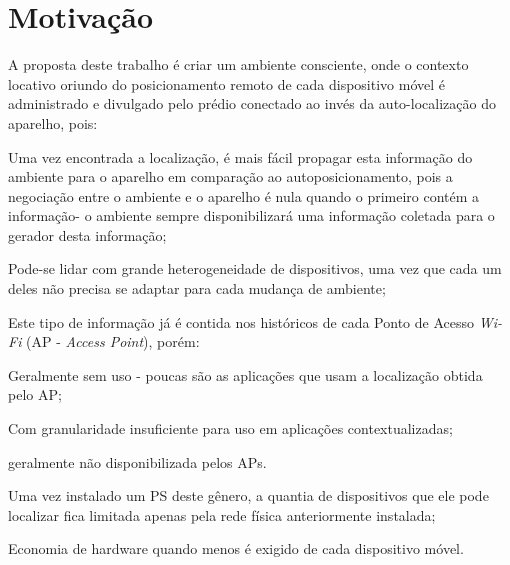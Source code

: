 \section{Motivação}
\label{sec:Motivação}

A proposta deste trabalho é criar um ambiente consciente, onde o contexto
locativo oriundo do posicionamento remoto de cada dispositivo móvel é
administrado e divulgado pelo prédio conectado ao invés da auto-localização do
aparelho, pois:

\begin{alineas}

	\item Uma vez encontrada a localização, é mais fácil propagar esta informação do
ambiente para o aparelho em comparação ao autoposicionamento, pois a negociação
entre o ambiente e o aparelho é nula quando o primeiro contém a informação- o
ambiente sempre disponibilizará uma informação coletada para o gerador desta
informação;

	\item Pode-se lidar com grande heterogeneidade de dispositivos, uma vez
que cada um deles não precisa se adaptar para cada mudança de ambiente;

	\item Este tipo de informação já é contida nos históricos de cada Ponto de
	Acesso \emph{Wi-Fi} (AP - \emph{Access Point}), porém:

	\begin{alineas}

		\item Geralmente sem uso - poucas são as aplicações que usam a
		localização obtida pelo AP;

		\item Com granularidade insuficiente para uso em aplicações
		contextualizadas;

		\item geralmente não disponibilizada pelos APs.

	\end{alineas}

	\item Uma vez instalado um PS deste gênero, a quantia de dispositivos que
	ele pode localizar fica limitada apenas pela rede física anteriormente
	instalada;

	\item Economia de hardware quando menos é exigido de cada dispositivo móvel.

\end{alineas}

